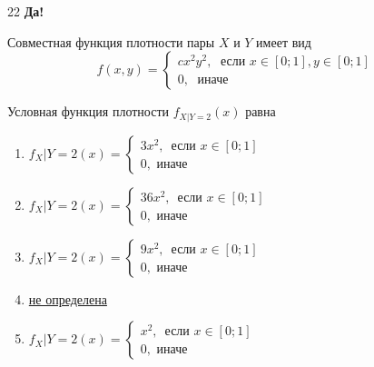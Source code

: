 \documentclass[t]{beamer}
\begin{document}
 \begin{frame} \label{22-Yes} 
\begin{block}{22  \textbf{Да!} 
		\hyperlink{23}{}} 

Совместная функция плотности пары $X$ и $Y$ имеет вид
\[
f(x,y)=\begin{cases}
cx^2y^2, \; \text{ если } x\in[0;1], y\in [0;1] \\
0, \; \text{ иначе}
\end{cases}
\]
 
Условная функция плотности  $f_{X|Y=2}(x)$ равна

 \end{block} 
\begin{enumerate} 
\item[] \hyperlink{22-No}{\beamergotobutton{} $f_X|Y=2(x)=\begin{cases} 3x^2,\, \text{ если }  x\in [0;1] \\ 0, \text{ иначе}     \end{cases}$}
\item[] \hyperlink{22-No}{\beamergotobutton{} $f_X|Y=2(x)=\begin{cases} 36x^2,\, \text{ если }  x\in [0;1] \\ 0, \text{ иначе}     \end{cases}$}
\item[] \hyperlink{22-No}{\beamergotobutton{} $f_X|Y=2(x)=\begin{cases} 9x^2,\, \text{ если }  x\in [0;1] \\ 0, \text{ иначе}     \end{cases}$}
\item[] \hyperlink{22-Yes}{\beamergotobutton{} не определена}
\item[] \hyperlink{22-No}{\beamergotobutton{} $f_X|Y=2(x)=\begin{cases} x^2,\, \text{ если }  x\in [0;1] \\ 0, \text{ иначе}     \end{cases}$}
\end{enumerate} 
\end{frame} 
\end{document}
